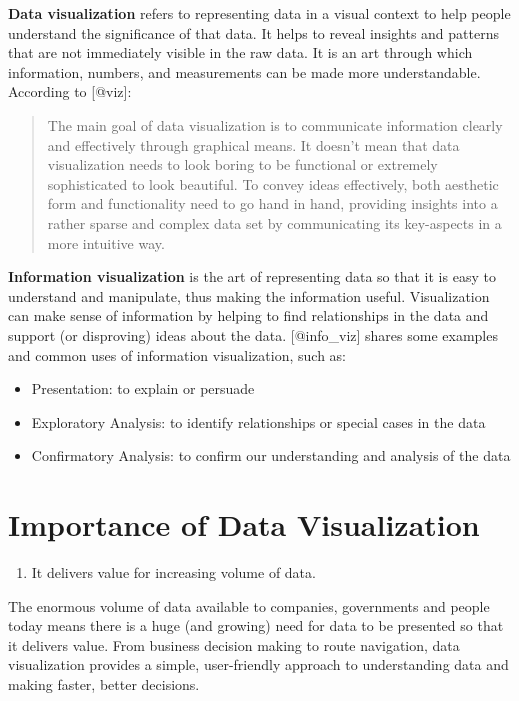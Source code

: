 \documentclass[]{book}
\providecommand{\tightlist}{%
  \setlength{\itemsep}{0pt}\setlength{\parskip}{0pt}}
\theoremstyle{definition}
\theoremstyle{definition}
\theoremstyle{definition}
\theoremstyle{remark}
\begin{document}
\textbf{Data visualization} refers to representing data in a visual
context to help people understand the significance of that data. It
helps to reveal insights and patterns that are not immediately visible
in the raw data. It is an art through which information, numbers, and
measurements can be made more understandable. According to {[}@viz{]}:

\begin{quote}
The main goal of data visualization is to communicate information
clearly and effectively through graphical means. It doesn't mean that
data visualization needs to look boring to be functional or extremely
sophisticated to look beautiful. To convey ideas effectively, both
aesthetic form and functionality need to go hand in hand, providing
insights into a rather sparse and complex data set by communicating its
key-aspects in a more intuitive way.
\end{quote}

\textbf{Information visualization} is the art of representing data so
that it is easy to understand and manipulate, thus making the
information useful. Visualization can make sense of information by
helping to find relationships in the data and support (or disproving)
ideas about the data. {[}@info\_viz{]} shares some examples and common
uses of information visualization, such as:

\begin{itemize}
\tightlist
\item
  Presentation: to explain or persuade
\item
  Exploratory Analysis: to identify relationships or special cases in
  the data
\item
  Confirmatory Analysis: to confirm our understanding and analysis of
  the data
\end{itemize}

\section{Importance of Data
Visualization}\label{importance-of-data-visualization}

\begin{enumerate}
\def\labelenumi{\arabic{enumi}.}
\tightlist
\item
  It delivers value for increasing volume of data.
\end{enumerate}

The enormous volume of data available to companies, governments and
people today means there is a huge (and growing) need for data to be
presented so that it delivers value. From business decision making to
route navigation, data visualization provides a simple, user-friendly
approach to understanding data and making faster, better decisions.
\end{document}
